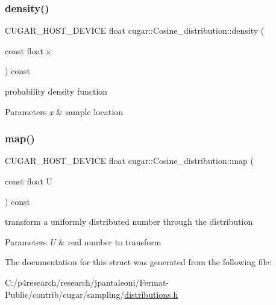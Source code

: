 \subsubsection{\texorpdfstring{density()}{density()}}
{\footnotesize\ttfamily C\+U\+G\+A\+R\+\_\+\+H\+O\+S\+T\+\_\+\+D\+E\+V\+I\+CE float cugar\+::\+Cosine\+\_\+distribution\+::density (\begin{DoxyParamCaption}\item[{const float}]{x }\end{DoxyParamCaption}) const\hspace{0.3cm}{\ttfamily [inline]}}

probability density function


\begin{DoxyParams}{Parameters}
{\em x} & sample location \\
\hline
\end{DoxyParams}
\mbox{\label{structcugar_1_1_cosine__distribution_a0440bb1dc47d5d8593fe568ae2b40cd9}} 
\subsubsection{\texorpdfstring{map()}{map()}}
{\footnotesize\ttfamily C\+U\+G\+A\+R\+\_\+\+H\+O\+S\+T\+\_\+\+D\+E\+V\+I\+CE float cugar\+::\+Cosine\+\_\+distribution\+::map (\begin{DoxyParamCaption}\item[{const float}]{U }\end{DoxyParamCaption}) const\hspace{0.3cm}{\ttfamily [inline]}}

transform a uniformly distributed number through the distribution


\begin{DoxyParams}{Parameters}
{\em U} & real number to transform \\
\hline
\end{DoxyParams}


The documentation for this struct was generated from the following file\+:\begin{DoxyCompactItemize}
\item 
C\+:/p4research/research/jpantaleoni/\+Fermat-\/\+Public/contrib/cugar/sampling/\hyperlink{distributions_8h}{distributions.\+h}\end{DoxyCompactItemize}

